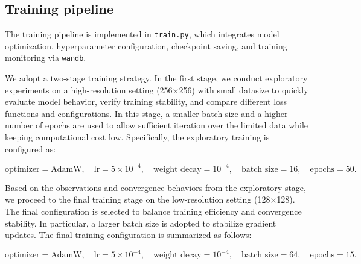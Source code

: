 \subsection{Training pipeline}

The training pipeline is implemented in \texttt{train.py}, which integrates model optimization, hyperparameter configuration, checkpoint saving, and training monitoring via \texttt{wandb}.

We adopt a two-stage training strategy. In the first stage, we conduct exploratory experiments on a high-resolution setting (256$\times$256) with small datasize to quickly evaluate model behavior, verify training stability, and compare different loss functions and configurations. In this stage, a smaller batch size and a higher number of epochs are used to allow sufficient iteration over the limited data while keeping computational cost low. Specifically, the exploratory training is configured as:

\[
\text{optimizer} = \text{AdamW}, \quad
\text{lr} = 5 \times 10^{-4}, \quad
\text{weight decay} = 10^{-4}, \quad
\text{batch size} = 16, \quad
\text{epochs} = 50.
\]

Based on the observations and convergence behaviors from the exploratory stage, we proceed to the final training stage on the low-resolution setting (128$\times$128). The final configuration is selected to balance training efficiency and convergence stability. In particular, a larger batch size is adopted to stabilize gradient updates. The final training configuration is summarized as follows:

\[
\text{optimizer} = \text{AdamW}, \quad
\text{lr} = 5 \times 10^{-4}, \quad
\text{weight decay} = 10^{-4}, \quad
\text{batch size} = 64, \quad
\text{epochs} = 15.
\]